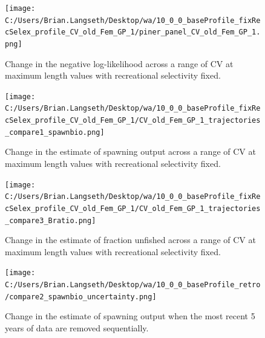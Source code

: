 \documentclass[11pt,
  english,
  letterpaper,
]{article}
\begin{document}
\begin{figure}
\centering
\texttt{[image: C:/Users/Brian.Langseth/Desktop/wa/10\_0\_0\_baseProfile\_fixRecSelex\_profile\_CV\_old\_Fem\_GP\_1/piner\_panel\_CV\_old\_Fem\_GP\_1.png]}
\caption{Change in the negative log-likelihood across a range of CV at maximum length values with recreational selectivity fixed.\label{fig:cv2-recfix-profile}}
\end{figure}

\tagmcend\tagstructend


\begin{figure}
\centering
\texttt{[image: C:/Users/Brian.Langseth/Desktop/wa/10\_0\_0\_baseProfile\_fixRecSelex\_profile\_CV\_old\_Fem\_GP\_1/CV\_old\_Fem\_GP\_1\_trajectories\_compare1\_spawnbio.png]}
\caption{Change in the estimate of spawning output across a range of CV at maximum length values with recreational selectivity fixed.\label{fig:cv2-recfix-ssb}}
\end{figure}

\tagmcend\tagstructend


\begin{figure}
\centering
\texttt{[image: C:/Users/Brian.Langseth/Desktop/wa/10\_0\_0\_baseProfile\_fixRecSelex\_profile\_CV\_old\_Fem\_GP\_1/CV\_old\_Fem\_GP\_1\_trajectories\_compare3\_Bratio.png]}
\caption{Change in the estimate of fraction unfished across a range of CV at maximum length values with recreational selectivity fixed.\label{fig:cv2-recfix-depl}}
\end{figure}

\tagmcend\tagstructend


\begin{figure}
\centering
\texttt{[image: C:/Users/Brian.Langseth/Desktop/wa/10\_0\_0\_baseProfile\_retro/compare2\_spawnbio\_uncertainty.png]}
\caption{Change in the estimate of spawning output when the most recent 5 years of data are removed sequentially.\label{fig:retro-ssb}}
\end{figure}

\tagmcend\tagstructend
\end{document}
